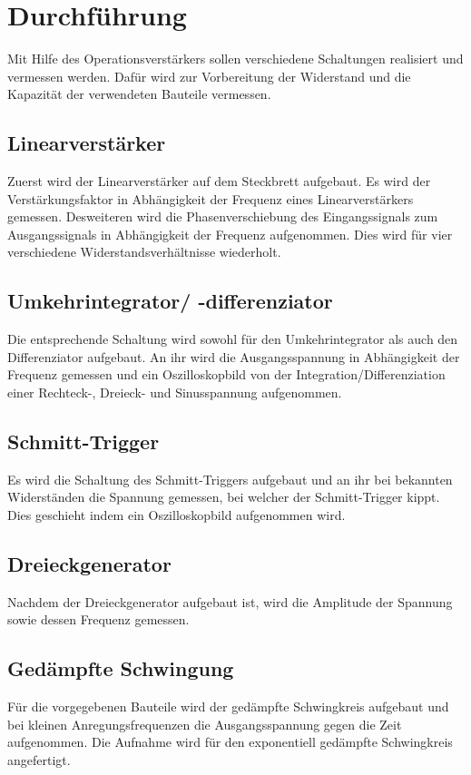 \section{Durchführung}%
\label{sec:durchführung}
Mit Hilfe des Operationsverstärkers sollen verschiedene Schaltungen
realisiert und vermessen werden.
Dafür wird zur Vorbereitung der Widerstand und die Kapazität der verwendeten 
Bauteile vermessen.

\subsection{Linearverstärker}%
\label{sub:linearverstaerker}
Zuerst wird der Linearverstärker auf dem Steckbrett aufgebaut.
Es wird der Verstärkungsfaktor in Abhängigkeit der Frequenz eines
Linearverstärkers gemessen.
Desweiteren wird die Phasenverschiebung des Eingangssignals zum Ausgangssignals
in Abhängigkeit der Frequenz aufgenommen.
Dies wird für vier verschiedene Widerstandsverhältnisse wiederholt.

\subsection{Umkehrintegrator/ -differenziator}%
\label{sub:umkehrintegrator_differenziator}
Die entsprechende Schaltung wird sowohl für den Umkehrintegrator als auch den
Differenziator aufgebaut.
An ihr wird die Ausgangsspannung in Abhängigkeit der Frequenz gemessen und ein
Oszilloskopbild von der Integration/Differenziation einer Rechteck-, Dreieck-
und Sinusspannung aufgenommen.

\subsection{Schmitt-Trigger}%
\label{sub:schmitt_trigger}
Es wird die Schaltung des Schmitt-Triggers aufgebaut und an ihr bei bekannten
Widerständen die Spannung gemessen, bei welcher der Schmitt-Trigger kippt.
Dies geschieht indem ein Oszilloskopbild aufgenommen wird.

\subsection{Dreieckgenerator}%
\label{sub:dreieckgenerator}
Nachdem der Dreieckgenerator aufgebaut ist,
wird die Amplitude der Spannung sowie dessen Frequenz gemessen.

\subsection{Gedämpfte Schwingung}%
\label{sub:gedaempfte_schwingung}
Für die vorgegebenen Bauteile wird der gedämpfte Schwingkreis aufgebaut und
bei kleinen Anregungsfrequenzen die Ausgangsspannung gegen die Zeit
aufgenommen.
Die Aufnahme wird für den exponentiell gedämpfte
Schwingkreis angefertigt.
